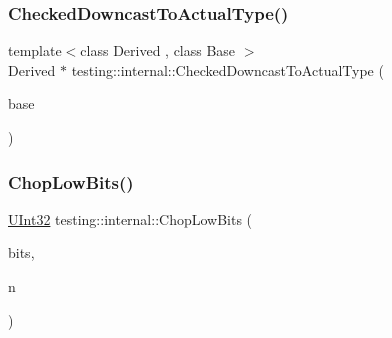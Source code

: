 \mbox{\label{namespacetesting_1_1internal_af54f5cf4d9e03836ecc0316d090cb4ed}} 
\subsubsection{\texorpdfstring{CheckedDowncastToActualType()}{CheckedDowncastToActualType()}}
{\footnotesize\ttfamily template$<$class Derived , class Base $>$ \\
Derived $\ast$ testing\+::internal\+::\+Checked\+Downcast\+To\+Actual\+Type (\begin{DoxyParamCaption}\item[{\mbox{\hyperlink{class_base}{Base}} $\ast$}]{base }\end{DoxyParamCaption})}

\mbox{\label{namespacetesting_1_1internal_a2c54b453387aa8a18f2f3e09f10b5a7d}} 
\subsubsection{\texorpdfstring{ChopLowBits()}{ChopLowBits()}}
{\footnotesize\ttfamily \mbox{\hyperlink{namespacetesting_1_1internal_a436defbb8e92c8e94e33ebcc86f278ba}{U\+Int32}} testing\+::internal\+::\+Chop\+Low\+Bits (\begin{DoxyParamCaption}\item[{\mbox{\hyperlink{namespacetesting_1_1internal_a436defbb8e92c8e94e33ebcc86f278ba}{U\+Int32}} $\ast$}]{bits,  }\item[{int}]{n }\end{DoxyParamCaption})\hspace{0.3cm}{\ttfamily [inline]}}

\mbox{\label{namespacetesting_1_1internal_a4638c74d9b32e971f9b321af6fafc2f1}} 
